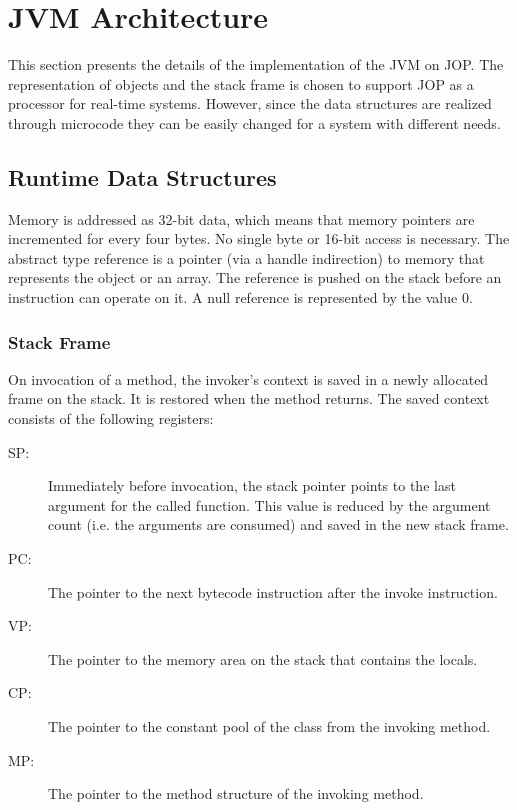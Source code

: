 \section{JVM Architecture}


This section presents the details of the implementation of the JVM on
JOP. The representation of objects and the stack frame is chosen to
support JOP as a processor for real-time systems. However, since the
data structures are realized through microcode they can be easily
changed for a system with different needs.

\subsection{Runtime Data Structures}


Memory is addressed as 32-bit data, which means that memory pointers
are incremented for every four bytes. No single byte or 16-bit access
is necessary. The abstract type reference is a pointer (via a handle
indirection) to memory that represents the object or an array. The
reference is pushed on the stack before an instruction can operate on
it. A null reference is represented by the value 0.

\subsubsection{Stack Frame}

On invocation of a method, the invoker's context is saved in a newly
allocated frame on the stack. It is restored when the method returns.
The saved context consists of the following registers:

\begin{description}

\item[SP:] Immediately before invocation, the stack pointer
    points to the last argument for the called function. This
    value is reduced by the argument count (i.e. the arguments
    are consumed) and saved in the new stack frame.

\item[PC:] The pointer to the next bytecode instruction after the invoke
instruction.

\item[VP:] The pointer to the memory area on the stack that contains
the locals.

\item[CP:] The pointer to the constant pool of the class from the invoking
method.

\item[MP:] The pointer to the method structure of the invoking method.

\end{description}

